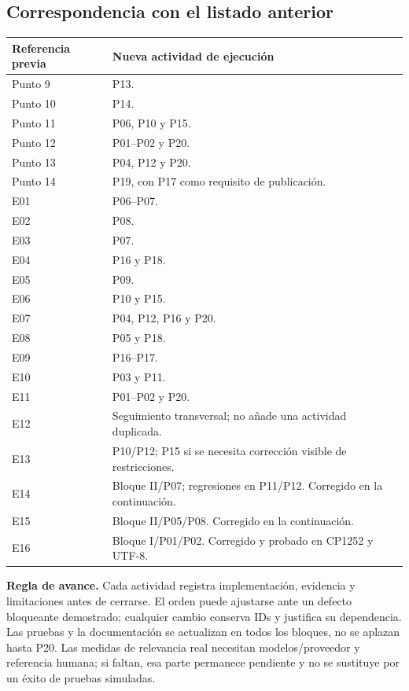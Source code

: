 \subsection{Correspondencia con el listado anterior}
\small
\begin{longtable}{p{}p{}}
\toprule Referencia previa & Nueva actividad de ejecución\\\midrule\endhead
Punto 9 & P13.\\
Punto 10 & P14.\\
Punto 11 & P06, P10 y P15.\\
Punto 12 & P01--P02 y P20.\\
Punto 13 & P04, P12 y P20.\\
Punto 14 & P19, con P17 como requisito de publicación.\\
E01 & P06--P07.\\
E02 & P08.\\
E03 & P07.\\
E04 & P16 y P18.\\
E05 & P09.\\
E06 & P10 y P15.\\
E07 & P04, P12, P16 y P20.\\
E08 & P05 y P18.\\
E09 & P16--P17.\\
E10 & P03 y P11.\\
E11 & P01--P02 y P20.\\
E12 & Seguimiento transversal; no añade una actividad duplicada.\\
E13 & P10/P12; P15 si se necesita corrección visible de restricciones.\\
E14 & Bloque II/P07; regresiones en P11/P12. Corregido en la continuación.\\
E15 & Bloque II/P05/P08. Corregido en la continuación.\\
E16 & Bloque I/P01/P02. Corregido y probado en CP1252 y UTF-8.\\
\bottomrule
\end{longtable}
\normalsize

\textbf{Regla de avance.} Cada actividad registra implementación, evidencia y
limitaciones antes de cerrarse. El orden puede ajustarse ante un defecto
bloqueante demostrado; cualquier cambio conserva IDs y justifica su dependencia.
Las pruebas y la documentación se actualizan en todos los bloques, no se aplazan
hasta P20. Las medidas de relevancia real necesitan modelos/proveedor y referencia
humana; si faltan, esa parte permanece pendiente y no se sustituye por un éxito
de pruebas simuladas.
